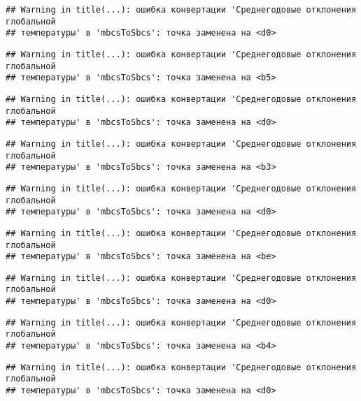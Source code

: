 \documentclass[
]{article}
\begin{document}
\begin{verbatim}
## Warning in title(...): ошибка конвертации 'Среднегодовые отклонения глобальной
## температуры' в 'mbcsToSbcs': точка заменена на <d0>
\end{verbatim}

\begin{verbatim}
## Warning in title(...): ошибка конвертации 'Среднегодовые отклонения глобальной
## температуры' в 'mbcsToSbcs': точка заменена на <b5>
\end{verbatim}

\begin{verbatim}
## Warning in title(...): ошибка конвертации 'Среднегодовые отклонения глобальной
## температуры' в 'mbcsToSbcs': точка заменена на <d0>
\end{verbatim}

\begin{verbatim}
## Warning in title(...): ошибка конвертации 'Среднегодовые отклонения глобальной
## температуры' в 'mbcsToSbcs': точка заменена на <b3>
\end{verbatim}

\begin{verbatim}
## Warning in title(...): ошибка конвертации 'Среднегодовые отклонения глобальной
## температуры' в 'mbcsToSbcs': точка заменена на <d0>
\end{verbatim}

\begin{verbatim}
## Warning in title(...): ошибка конвертации 'Среднегодовые отклонения глобальной
## температуры' в 'mbcsToSbcs': точка заменена на <be>
\end{verbatim}

\begin{verbatim}
## Warning in title(...): ошибка конвертации 'Среднегодовые отклонения глобальной
## температуры' в 'mbcsToSbcs': точка заменена на <d0>
\end{verbatim}

\begin{verbatim}
## Warning in title(...): ошибка конвертации 'Среднегодовые отклонения глобальной
## температуры' в 'mbcsToSbcs': точка заменена на <b4>
\end{verbatim}

\begin{verbatim}
## Warning in title(...): ошибка конвертации 'Среднегодовые отклонения глобальной
## температуры' в 'mbcsToSbcs': точка заменена на <d0>
\end{verbatim}
\end{document}
